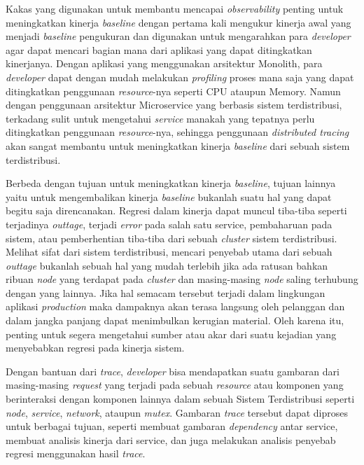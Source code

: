 Kakas yang digunakan untuk membantu mencapai \textit{observability} penting untuk meningkatkan kinerja \textit{baseline} dengan pertama kali mengukur kinerja awal yang menjadi \textit{baseline} pengukuran dan digunakan untuk mengarahkan para \textit{developer} agar dapat mencari bagian mana dari aplikasi yang dapat ditingkatkan kinerjanya. Dengan aplikasi yang menggunakan arsitektur Monolith, para \textit{developer} dapat dengan mudah melakukan \textit{profiling} proses mana saja yang dapat ditingkatkan penggunaan \textit{resource}-nya seperti CPU ataupun Memory. Namun dengan penggunaan arsitektur Microservice yang berbasis sistem terdistribusi, terkadang sulit untuk mengetahui \textit{service} manakah yang tepatnya perlu ditingkatkan penggunaan \textit{resource}-nya, sehingga penggunaan \textit{distributed tracing} akan sangat membantu untuk meningkatkan kinerja \textit{baseline} dari sebuah sistem terdistribusi.

Berbeda dengan tujuan untuk meningkatkan kinerja \textit{baseline}, tujuan lainnya yaitu untuk mengembalikan kinerja \textit{baseline} bukanlah suatu hal yang dapat begitu saja direncanakan. Regresi dalam kinerja dapat muncul tiba-tiba seperti terjadinya \textit{outtage}, terjadi \textit{error} pada salah satu service, pembaharuan pada sistem, atau pemberhentian tiba-tiba dari sebuah \textit{cluster} sistem terdistribusi. Melihat sifat dari sistem terdistribusi, mencari penyebab utama dari sebuah \textit{outtage} bukanlah sebuah hal yang mudah terlebih jika ada ratusan bahkan ribuan \textit{node} yang terdapat pada \textit{cluster} dan masing-masing \textit{node} saling terhubung dengan yang lainnya. Jika hal semacam tersebut terjadi dalam lingkungan aplikasi \textit{production} maka dampaknya akan terasa langsung oleh pelanggan dan dalam jangka panjang dapat menimbulkan kerugian material. Oleh karena itu, penting untuk segera mengetahui sumber atau akar dari suatu kejadian yang menyebabkan regresi pada kinerja sistem.

 Dengan bantuan dari \textit{trace}, \textit{developer} bisa mendapatkan suatu gambaran dari masing-masing \textit{request} yang terjadi pada sebuah \textit{resource} atau komponen yang berinteraksi dengan komponen lainnya dalam sebuah Sistem Terdistribusi seperti \textit{node}, \textit{service}, \textit{network}, ataupun \textit{mutex}. Gambaran \textit{trace} tersebut dapat diproses untuk berbagai tujuan, seperti membuat gambaran \textit{dependency} antar service, membuat analisis kinerja dari service, dan juga melakukan analisis penyebab regresi menggunakan hasil \textit{trace}.
  

